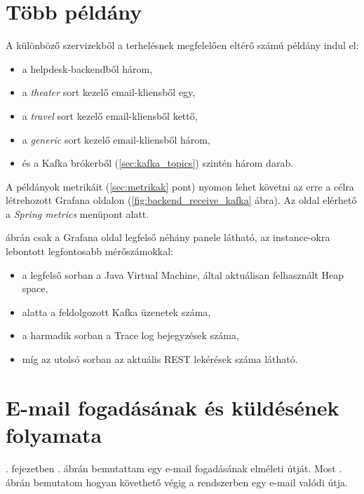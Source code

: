 \section{Több példány}
A különböző szervizekből a terhelésnek megfelelően eltérő számú példány indul el:

\begin{itemize}
	\item a helpdesk-backendből három,
	\item a \textit{theater} sort kezelő email-kliensből egy,
	\item a \textit{travel} sort kezelő email-kliensből kettő,
	\item a \textit{generic} sort kezelő email-kliensből három,
	\item és a Kafka brókerből (\ref{sec:kafka_topics}) szintén három darab.
\end{itemize}

A példányok metrikáit (\ref{sec:metrikak} pont) nyomon lehet követni az erre a célra létrehozott Grafana oldalon (\ref{fig:backend_receive_kafka} ábra). Az oldal elérhető a  \textit{Spring metrics} menüpont alatt.

 ábrán csak a Grafana oldal legfelső néhány panele látható, az instance-okra lebontott legfontosabb mérőszámokkal:

\begin{itemize}
	\item a legfelső sorban a Java Virtual Machine, által aktuálisan felhasznált Heap space,	
	\item alatta a feldolgozott Kafka üzenetek száma,
	\item a harmadik sorban a Trace log bejegyzések száma,
	\item míg az utolsó sorban az aktuális REST lekérések száma látható.
\end{itemize}



\section{E-mail fogadásának és küldésének folyamata}
. fejezetben . ábrán bemutattam egy e-mail fogadásának elméleti útját. Most . ábrán bemutatom hogyan követhető végig a rendszerben egy e-mail valódi útja.

